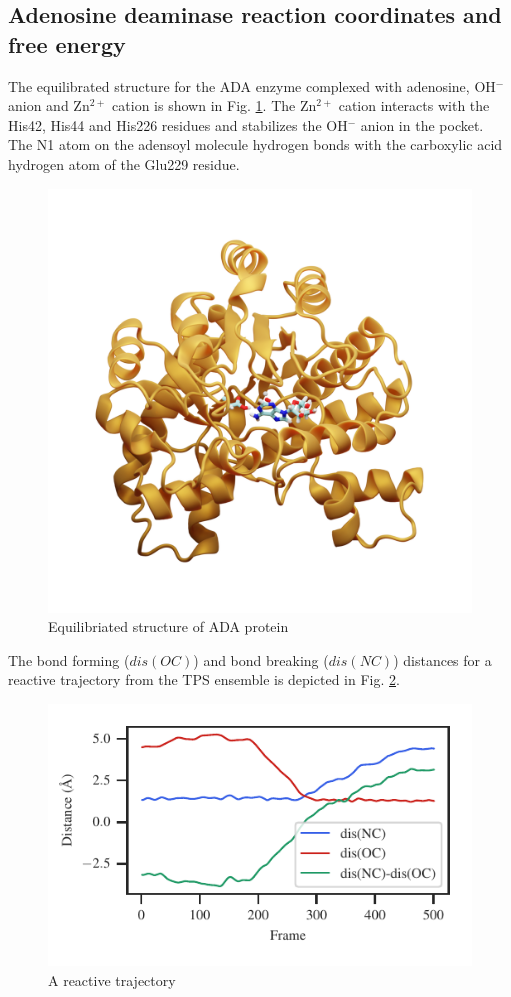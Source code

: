 \documentclass[journal=jpcbfk,manuscript=article,layout=traditional]{achemso}
\begin{document}
\subsection{Adenosine deaminase reaction coordinates and free energy}
The equilibrated structure for the ADA enzyme complexed with adenosine, 
OH$^{-}$ anion and Zn$^{2+}$ cation is shown in Fig. \ref{fig:ada-equil}.
The Zn$^{2+}$ cation interacts with the His42, His44 and His226 residues
and stabilizes the OH$^{-}$ anion in the pocket. The N1 atom on the adensoyl 
molecule hydrogen bonds with the carboxylic acid hydrogen atom of the Glu229 
residue.  
\begin{figure}[ht!]
\centering
\includegraphics[scale=0.2]{./figures/ada-equil.png}
\caption{Equilibriated structure of ADA protein}
\label{fig:ada-equil}
\end{figure}
The bond forming ($dis(OC)$) and bond breaking ($dis(NC)$) distances 
for a reactive trajectory from the TPS ensemble is depicted 
in Fig. \ref{fig:ada-reactive-traj}.
\begin{figure}[ht!]
\includegraphics[scale=1.0]{figures/ada-diff60.pdf}
\caption{A reactive trajectory}
\label{fig:ada-reactive-traj}
\end{figure}
\end{document}
